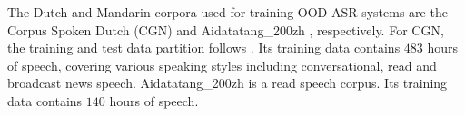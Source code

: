 \documentclass[a4paper]{article}
\begin{document}
\begin{table}[!tbp]
\renewcommand\arraystretch{0.6}
\centering
\caption{Libri-light training data and its subsets.}
\label{tab:libri_light_data}
\end{table}

The Dutch and Mandarin corpora used for training OOD ASR systems are the Corpus Spoken Dutch (CGN) \cite{oostdijk2000spoken} and Aidatatang\_200zh \cite{aidatatang}, respectively. 
For CGN, the training and test data partition follows \cite{laurensw75cgn_kaldi}. Its training data contains $483$ hours of speech, covering various speaking styles including conversational, read and broadcast news speech.
Aidatatang\_200zh is a read speech corpus.
Its training data contains $140$ hours of speech.   
\end{document}

